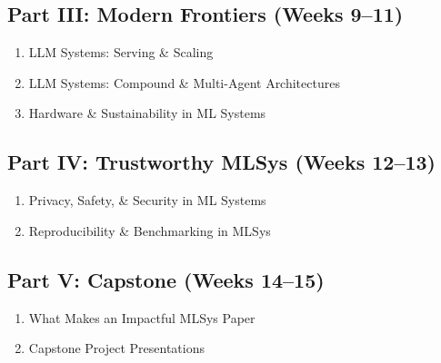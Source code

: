 \documentclass[11pt]{article}
\begin{document}
\subsection*{Part III: Modern Frontiers (Weeks 9–11)}
\begin{enumerate}[resume, leftmargin=*]
    \item LLM Systems: Serving \& Scaling  
    \item LLM Systems: Compound \& Multi-Agent Architectures  
    \item Hardware \& Sustainability in ML Systems  
\end{enumerate}

\subsection*{Part IV: Trustworthy MLSys (Weeks 12–13)}
\begin{enumerate}[resume, leftmargin=*]
    \item Privacy, Safety, \& Security in ML Systems  
    \item Reproducibility \& Benchmarking in MLSys  
\end{enumerate}

\subsection*{Part V: Capstone (Weeks 14–15)}
\begin{enumerate}[resume, leftmargin=*]
    \item What Makes an Impactful MLSys Paper  
    \item Capstone Project Presentations  
\end{enumerate}
\end{document}
